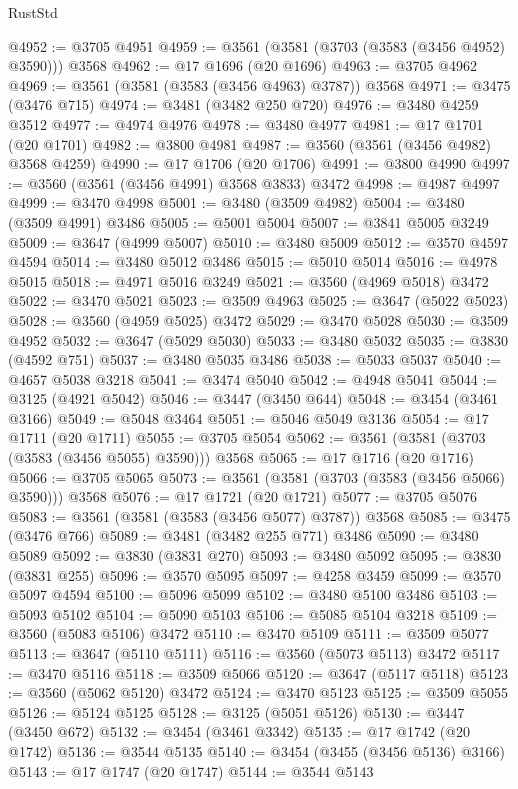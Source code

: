 \begin{lexlean}{RustStd}
\begin{coremodule}
{\begin{coremodule}
{{{{{{{{{{{{{{{{{{{{{{{{{{{{{{{{{{{{{{{{{{{{{@4952 := @3705 @4951
@4959 := @3561 (@3581 (@3703 (@3583 (@3456 @4952) @3590))) @3568
@4962 := @17 @1696 (@20 @1696)
@4963 := @3705 @4962
@4969 := @3561 (@3581 (@3583 (@3456 @4963) @3787)) @3568
@4971 := @3475 (@3476 @715)
@4974 := @3481 (@3482 @250 @720)
@4976 := @3480 @4259 @3512
@4977 := @4974 @4976
@4978 := @3480 @4977
@4981 := @17 @1701 (@20 @1701)
@4982 := @3800 @4981
@4987 := @3560 (@3561 (@3456 @4982) @3568 @4259)
@4990 := @17 @1706 (@20 @1706)
@4991 := @3800 @4990
@4997 := @3560 (@3561 (@3456 @4991) @3568 @3833) @3472
@4998 := @4987 @4997
@4999 := @3470 @4998
@5001 := @3480 (@3509 @4982)
@5004 := @3480 (@3509 @4991) @3486
@5005 := @5001 @5004
@5007 := @3841 @5005 @3249
@5009 := @3647 (@4999 @5007)
@5010 := @3480 @5009
@5012 := @3570 @4597 @4594
@5014 := @3480 @5012 @3486
@5015 := @5010 @5014
@5016 := @4978 @5015
@5018 := @4971 @5016 @3249
@5021 := @3560 (@4969 @5018) @3472
@5022 := @3470 @5021
@5023 := @3509 @4963
@5025 := @3647 (@5022 @5023)
@5028 := @3560 (@4959 @5025) @3472
@5029 := @3470 @5028
@5030 := @3509 @4952
@5032 := @3647 (@5029 @5030)
@5033 := @3480 @5032
@5035 := @3830 (@4592 @751)
@5037 := @3480 @5035 @3486
@5038 := @5033 @5037
@5040 := @4657 @5038 @3218
@5041 := @3474 @5040
@5042 := @4948 @5041
@5044 := @3125 (@4921 @5042)
@5046 := @3447 (@3450 @644)
@5048 := @3454 (@3461 @3166)
@5049 := @5048 @3464
@5051 := @5046 @5049 @3136
@5054 := @17 @1711 (@20 @1711)
@5055 := @3705 @5054
@5062 := @3561 (@3581 (@3703 (@3583 (@3456 @5055) @3590))) @3568
@5065 := @17 @1716 (@20 @1716)
@5066 := @3705 @5065
@5073 := @3561 (@3581 (@3703 (@3583 (@3456 @5066) @3590))) @3568
@5076 := @17 @1721 (@20 @1721)
@5077 := @3705 @5076
@5083 := @3561 (@3581 (@3583 (@3456 @5077) @3787)) @3568
@5085 := @3475 (@3476 @766)
@5089 := @3481 (@3482 @255 @771) @3486
@5090 := @3480 @5089
@5092 := @3830 (@3831 @270)
@5093 := @3480 @5092
@5095 := @3830 (@3831 @255)
@5096 := @3570 @5095
@5097 := @4258 @3459
@5099 := @3570 @5097 @4594
@5100 := @5096 @5099
@5102 := @3480 @5100 @3486
@5103 := @5093 @5102
@5104 := @5090 @5103
@5106 := @5085 @5104 @3218
@5109 := @3560 (@5083 @5106) @3472
@5110 := @3470 @5109
@5111 := @3509 @5077
@5113 := @3647 (@5110 @5111)
@5116 := @3560 (@5073 @5113) @3472
@5117 := @3470 @5116
@5118 := @3509 @5066
@5120 := @3647 (@5117 @5118)
@5123 := @3560 (@5062 @5120) @3472
@5124 := @3470 @5123
@5125 := @3509 @5055
@5126 := @5124 @5125
@5128 := @3125 (@5051 @5126)
@5130 := @3447 (@3450 @672)
@5132 := @3454 (@3461 @3342)
@5135 := @17 @1742 (@20 @1742)
@5136 := @3544 @5135
@5140 := @3454 (@3455 (@3456 @5136) @3166)
@5143 := @17 @1747 (@20 @1747)
@5144 := @3544 @5143
}}}}}}}}}}}}}}}}}}}}}}}}}}}}}}}}}}}}}}}}}}}}}
\end{coremodule}}
\end{coremodule}
\end{lexlean}

